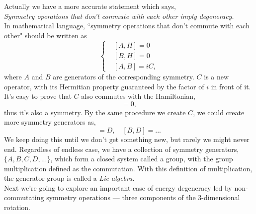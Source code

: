 \documentclass{article}
\newcommand{\be}{\begin{equation}}
\newcommand{\ee}{\end{equation}}
\renewcommand{\1}{\left}
\renewcommand{\2}{\right}
\begin{document}
Actually we have a more accurate statement which says,\\

\textit{Symmetry operations that don't commute with each other imply degeneracy.}\\

In mathematical language, ``symmetry operations that don't commute with each other" should be written as
\be\1\{\begin{split}
&[A,H]=0\\
&[B,H]=0\\
&[A,B]=iC,
\end{split}\2.\ee
where $A$ and $B$ are generators of the corresponding symmetry. $C$ is a new operator, with its Hermitian property guaranteed by the factor of $i$ in front of it. It's easy to prove that $C$ also commutes with the Hamiltonian,
\be
[C,H]=0,
\ee
thus it's also a symmetry. By the same procedure we create $C$, we could create more symmetry generators as,
\be
[A,C]=D, \quad  [B,D]=...
\ee
We keep doing this until we don't get something new, but rarely we might never end. Regardless of endless case, we have a collection of symmetry generators, $\{A,B,C,D,...\}$, which form a closed system called a group, with the group multiplication defined as the commutation. With this definition of multiplication, the generator group is called a \textit{Lie algebra}.\\

Next we're going to explore an important case of energy degeneracy led by non-commutating symmetry operations --- three components of the 3-dimensional rotation.
\end{document}
